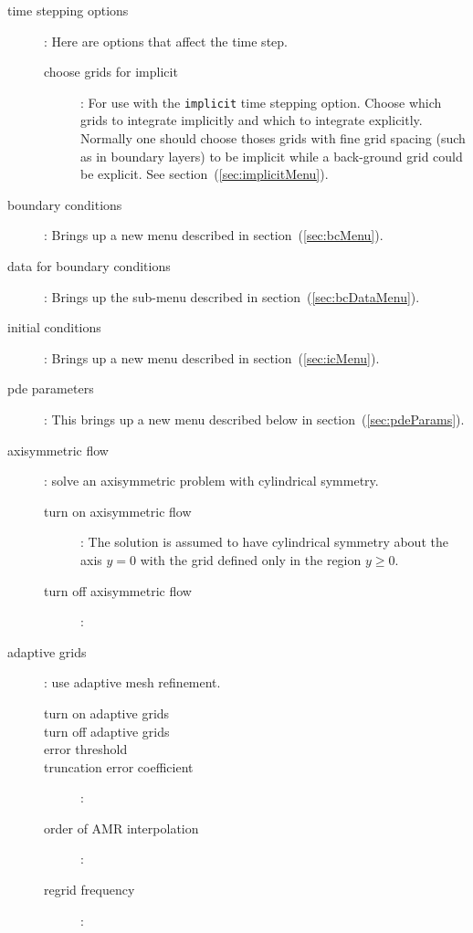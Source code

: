 \begin{description}
  \item[time stepping options] : Here are options that affect the time step.
    \begin{description}
      \item[choose grids for implicit] : For use with the {\tt implicit} time stepping option. Choose 
         which grids to integrate implicitly and which to integrate explicitly. Normally one should choose
         thoses grids with fine grid spacing (such as in boundary layers) to be implicit while a back-ground
       grid could be explicit. See section~(\ref{sec:implicitMenu}).
    \end{description}
  \item[boundary conditions] : Brings up a new menu described in section~(\ref{sec:bcMenu}).
  \item[data for boundary conditions] : Brings up the sub-menu described in section~(\ref{sec:bcDataMenu}).
  \item[initial conditions] : Brings up a new menu described in section~(\ref{sec:icMenu}).
  \item[pde parameters] : This brings up a new menu described below in section~(\ref{sec:pdeParams}).
  \item[axisymmetric flow] : solve an axisymmetric problem with cylindrical symmetry.
    \begin{description}
      \item[turn on axisymmetric flow] : The solution is assumed to have cylindrical symmetry about
                 the axis $y=0$ with the grid defined only in the region $y\ge 0$.
      \item[turn off axisymmetric flow] :
    \end{description}
   \item[adaptive grids] : use adaptive mesh refinement.
     \begin{description}
       \item[turn on adaptive grids] 
       \item[turn off adaptive grids] 
       \item[error threshold]
       \item[truncation error coefficient] : 
       \item[order of AMR interpolation] : 
       \item[regrid frequency] : 

\end{description}
\end{description}
